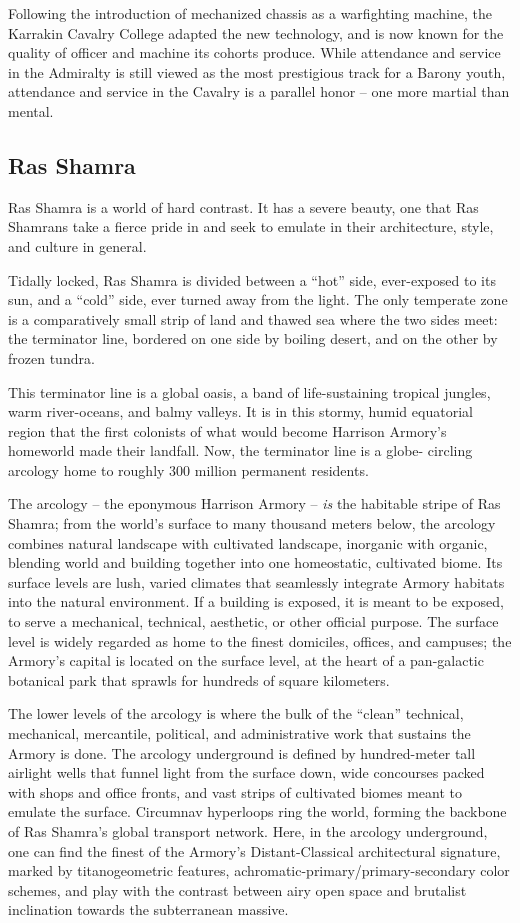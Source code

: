 Following the introduction of mechanized chassis as a warfighting machine, the Karrakin Cavalry
College adapted the new technology, and is now known for the quality of officer and machine its
cohorts produce. While attendance and service in the Admiralty is still viewed as the most
prestigious track for a Barony youth, attendance and service in the Cavalry is a parallel honor --
one more martial than mental.

\subsection{Ras Shamra}

Ras Shamra is a world of hard contrast. It has a severe beauty, one that Ras Shamrans take a
fierce pride in and seek to emulate in their architecture, style, and culture in general.

Tidally locked, Ras Shamra is divided between a “hot” side, ever-exposed to its sun, and a “cold”
side, ever turned away from the light. The only temperate zone is a comparatively small strip of
land and thawed sea where the two sides meet: the terminator line, bordered on one side by
boiling desert, and on the other by frozen tundra.

This terminator line is a global oasis, a band of life-sustaining tropical jungles, warm river-oceans,
and balmy valleys. It is in this stormy, humid equatorial region that the first colonists of what would
become Harrison Armory’s homeworld made their landfall. Now, the terminator line is a globe-
circling arcology home to roughly 300 million permanent residents.

The arcology -- the eponymous Harrison Armory -- \textit{is} the habitable stripe of Ras Shamra; from the
world’s surface to many thousand meters below, the arcology combines natural landscape with
cultivated landscape, inorganic with organic, blending world and building together into one
homeostatic, cultivated biome. Its surface levels are lush, varied climates that seamlessly
integrate Armory habitats into the natural environment. If a building is exposed, it is meant to be
exposed, to serve a mechanical, technical, aesthetic, or other official purpose. The surface level is
widely regarded as home to the finest domiciles, offices, and campuses; the Armory’s capital is
located on the surface level, at the heart of a pan-galactic botanical park that sprawls for
hundreds of square kilometers.

The lower levels of the arcology is where the bulk of the “clean” technical, mechanical, mercantile,
political, and administrative work that sustains the Armory is done. The arcology underground is
defined by hundred-meter tall airlight wells that funnel light from the surface down, wide
concourses packed with shops and office fronts, and vast strips of cultivated biomes meant to
emulate the surface. Circumnav hyperloops ring the world, forming the backbone of Ras
Shamra’s global transport network. Here, in the arcology underground, one can find the finest of
the Armory’s Distant-Classical architectural signature, marked by titanogeometric features,
achromatic-primary/primary-secondary color schemes, and play with the contrast between airy
open space and brutalist inclination towards the subterranean massive.

